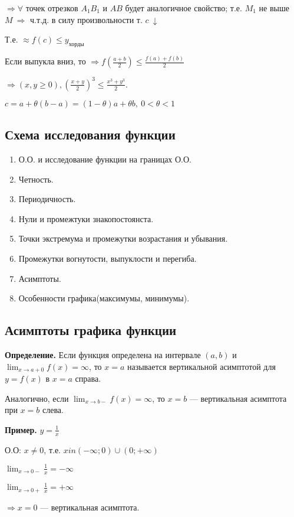 \documentclass{article}
\begin{document}
\(\Rightarrow \forall\) точек отрезков \(A_1B_1\) и \(AB\) будет аналогичное свойство; т.е. \(M_1\) не выше \(M\ \Rightarrow\) ч.т.д. в силу произвольности т. \(c\ \downarrow\)

Т.е. \(\approx f(c) \leq y_{\textrm{хорды}}\)

Если выпукла вниз, то \(\Rightarrow f(\frac{a+b}{2}) \leq \frac{f(a)+f(b)}{2}\)

\(\Rightarrow (x, y \geq 0), (\frac{x+y}{2})^3 \leq \frac{x^3 + y^3}{2}\).

\(c = a +\theta(b - a) = (1 - \theta)a + \theta b,\ 0 < \theta < 1\)

\subsection{Схема исследования функции}

\begin{enumerate}
    \item О.О. и исследование функции на границах О.О.
    \item Четность.
    \item Периодичность.
    \item Нули и промежтуки знакопостоянста.
    \item Точки экстремума и промежутки возрастания и убывания.
    \item Промежутки вогнутости, выпуклости и перегиба.
    \item Асимптоты.
    \item Особенности графика(максимумы, минимумы).
\end{enumerate}

\subsection{Асимптоты графика функции}

\textbf{Определение.} Если функция определена на интервале \( (a, b) \) и \( \lim_{x \to a+0} f(x) = \infty \), то \( x = a \) называется вертикальной асимптотой для \( y = f(x) \) в \( x = a \) справа.

Аналогично, если \(\lim_{x \to b-} f(x) = \infty\), то \(x = b\) --- вертикальная асимптота при \(x = b\) слева.

\textbf{Пример.} \( y = \frac{1}{x} \)

О.О: \( x \neq 0 \), т.е. \( x in (-\infty; 0) \cup (0; +\infty) \)

\( \lim_{x \to 0-} \frac{1}{x} = -\infty \)

\( \lim_{x \to 0+} \frac{1}{x} = +\infty \) 

\( \Rightarrow x = 0 \) --- вертикальная асимптота.
\end{document}
